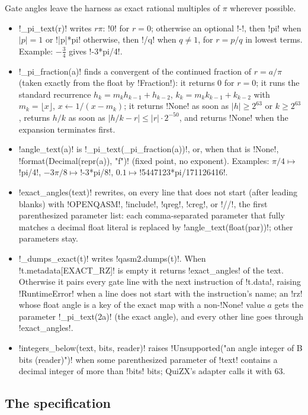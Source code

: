 Gate angles leave the harness as exact rational multiples of $\pi$ wherever possible.
\begin{itemize}
\item \py!_pi_text(r)! writes $r\pi$: \code!0! for $r=0$; otherwise an optional \code!-!, then \code!pi! when $|p|=1$ or \code!|p|*pi! otherwise, then \code!/q! when $q\neq1$, for $r=p/q$ in lowest terms. Example: $-\tfrac34$ gives \code!-3*pi/4!.
\item \py!_pi_fraction(a)! finds a convergent of the continued fraction of $r=a/\pi$ (taken exactly from the float by \py!Fraction!): it returns $0$ for $r=0$; it runs the standard recurrence $h_k=m_kh_{k-1}+h_{k-2}$, $k_k=m_kk_{k-1}+k_{k-2}$ with $m_k=\lfloor x\rfloor$, $x\leftarrow1/(x-m_k)$; it returns \py!None! as soon as $|h|\geq2^{63}$ or $k\geq2^{63}$, returns $h/k$ as soon as $|h/k-r|\leq|r|\cdot2^{-50}$, and returns \py!None! when the expansion terminates first.
\item \py!angle_text(a)! is \py!_pi_text(_pi_fraction(a))!, or, when that is \py!None!, \py!format(Decimal(repr(a)), "f")! (fixed point, no exponent). Examples: $\pi/4\mapsto$\code!pi/4!, $-3\pi/8\mapsto$\code!-3*pi/8!, $0.1\mapsto$\code!5447123*pi/171126416!.
\item \py!exact_angles(text)! rewrites, on every line that does not start (after leading blanks) with \code!OPENQASM!, \code!include!, \code!qreg!, \code!creg!, or \code!//!, the first parenthesized parameter list: each comma-separated parameter that fully matches a decimal float literal is replaced by \py!angle_text(float(par))!; other parameters stay.
\item \py!_dumps_exact(t)! writes \py!qasm2.dumps(t)!. When \py!t.metadata[EXACT_RZ]! is empty it returns \py!exact_angles! of the text. Otherwise it pairs every gate line with the next instruction of \py!t.data!, raising \py!RuntimeError! when a line does not start with the instruction's name; an \code!rz! whose float angle is a key of the exact map with a non-\py!None! value $a$ gets the parameter \py!_pi_text(2a)! (the exact angle), and every other line goes through \py!exact_angles!.
\item \py!integers_below(text, bits, reader)! raises \py!Unsupported("an angle integer of B bits (reader)")! when some parenthesized parameter of \py!text! contains a decimal integer of more than \py!bits! bits; QuiZX's adapter calls it with $63$.
\end{itemize}

\subsection{The specification}\label{sec:bench-tools-spec}

